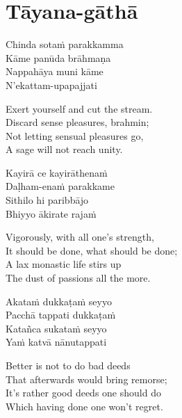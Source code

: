 
\section{Tāyana-gāthā}


\begin{leader}
\end{leader}

\smallskip


Chinda sotaṁ parakkamma\\
Kāme panūda brāhmaṇa\\
Nappahāya muni kāme\\
N'ekattam-upapajjati

\begin{english}
  Exert yourself and cut the stream.\\
  Discard sense pleasures, brahmin;\\
  Not letting sensual pleasures go,\\
  A sage will not reach unity.
\end{english}

Kayirā ce kayirāthenaṁ\\
Daḷham-enaṁ parakkame\\
Sithilo hi paribbājo\\
Bhiyyo ākirate rajaṁ

\ifreferenceedition
\clearpage
\fi

\begin{english}
  Vigorously, with all one's strength,\\
  It should be done, what should be done;\\
  A lax monastic life stirs up\\
  The dust of passions all the more.
\end{english}

Akataṁ dukkaṭaṁ seyyo\\
Pacchā tappati dukkaṭaṁ\\
Katañca sukataṁ seyyo\\
Yaṁ katvā nānutappati

\begin{english}
  Better is not to do bad deeds\\
  That afterwards would bring remorse;\\
  It's rather good deeds one should do\\
  Which having done one won't regret.
\end{english}

